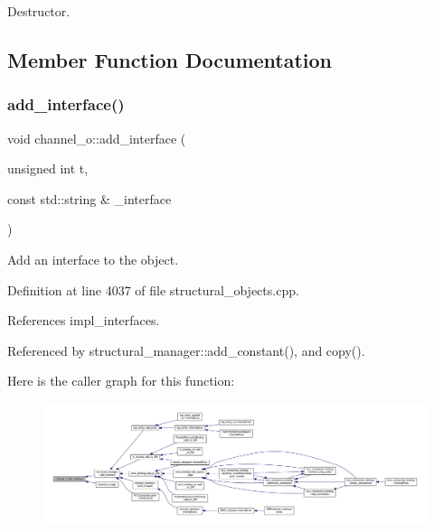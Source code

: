 Destructor. 



\subsection{Member Function Documentation}
\mbox{\label{classchannel__o_ab8492a177aaf78aaec1d521f29383793}} 
\subsubsection{\texorpdfstring{add\+\_\+interface()}{add\_interface()}}
{\footnotesize\ttfamily void channel\+\_\+o\+::add\+\_\+interface (\begin{DoxyParamCaption}\item[{unsigned int}]{t,  }\item[{const std\+::string \&}]{\+\_\+interface }\end{DoxyParamCaption})}



Add an interface to the object. 



Definition at line 4037 of file structural\+\_\+objects.\+cpp.



References impl\+\_\+interfaces.



Referenced by structural\+\_\+manager\+::add\+\_\+constant(), and copy().

Here is the caller graph for this function\+:
\nopagebreak
\begin{figure}[H]
\begin{center}
\leavevmode
\includegraphics[width=350pt]{d3/d41/classchannel__o_ab8492a177aaf78aaec1d521f29383793_icgraph}
\end{center}
\end{figure}
\mbox{\label{classchannel__o_a3b8469cc1a62c14d441aa9d1469aa158}} 
